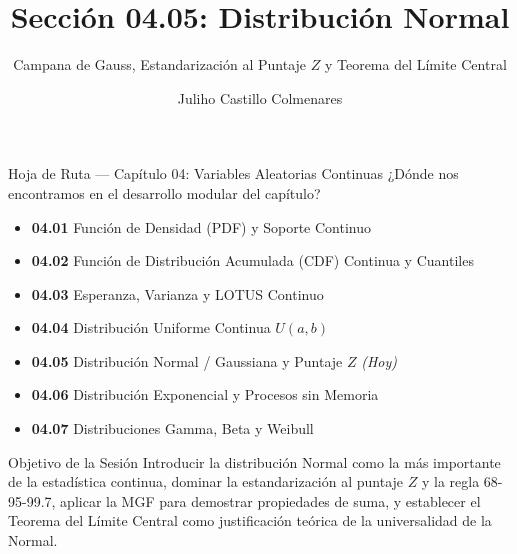 \documentclass[10pt, aspectratio=169]{beamer}
\title[Distribución Normal]{Sección 04.05: Distribución Normal}
\subtitle{Campana de Gauss, Estandarización al Puntaje $Z$ y Teorema del Límite Central}
\author[J. Castillo Colmenares]{Juliho Castillo Colmenares}
\institute{Tecnológico de Monterrey}
\date{\vspace{-1.2cm}}
\begin{document}
\begin{frame}[plain]
  \vspace{-0.8cm}
  \titlepage
\end{frame}

\begin{frame}{Hoja de Ruta --- Capítulo 04: Variables Aleatorias Continuas}
  \footnotesize
  ¿Dónde nos encontramos en el desarrollo modular del capítulo? \pause
  \begin{itemize}\itemsep=0.08em
    \item \textbf{04.01} Función de Densidad (PDF) y Soporte Continuo \pause
    \item \textbf{04.02} Función de Distribución Acumulada (CDF) Continua y Cuantiles \pause
    \item \textbf{04.03} Esperanza, Varianza y LOTUS Continuo \pause
    \item \textbf{04.04} Distribución Uniforme Continua $U(a, b)$ \pause
    \item \textbf{04.05} Distribución Normal / Gaussiana y Puntaje $Z$ \emph{(Hoy)} \pause
    \item \textbf{04.06} Distribución Exponencial y Procesos sin Memoria \pause
    \item \textbf{04.07} Distribuciones Gamma, Beta y Weibull
  \end{itemize}
  \vspace{-0.05cm}
  \begin{block}{Objetivo de la Sesión}
    Introducir la distribución Normal como la más importante de la estadística continua, dominar la estandarización al puntaje $Z$ y la regla 68-95-99.7, aplicar la MGF para demostrar propiedades de suma, y establecer el Teorema del Límite Central como justificación teórica de la universalidad de la Normal.
  \end{block}
\end{frame}
\end{document}
